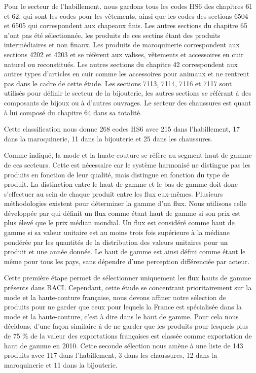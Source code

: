 \documentclass[french,10pt,a4paper]{article}
\begin{document}
Pour le secteur de l'habillement, nous gardons tous les codes HS6 des chapitres 61 et 62, qui sont les codes pour les vêtements, ainsi que les codes des sections 6504 et 6505 qui correspondent aux chapeaux finis. Les autres sections du chapitre 65 n'ont pas été sélectionnée, les produits de ces sectins étant des produits intermédiaires et non finaux. Les produits de maroquinerie correspondent aux sections 4202 et 4203 et se réfèrent aux valises, vêtements et accessoires en cuir naturel ou reconstitués. Les autres sections du chapitre 42 correspondent aux autres types d'articles en cuir comme les accessoires pour animaux et ne rentrent pas dans le cadre de cette étude. Les sections 7113, 7114, 7116 et 7117 sont utilisés pour définir le secteur de la bijouterie, les autres sections se référant à des composants de bijoux ou à d'autres ouvrages. Le secteur des chaussures est quant à lui composé du chapitre 64 dans sa totalité.

Cette classification nous donne 268 codes HS6 avec 215 dans l'habillement, 17 dans la maroquinerie, 11 dans la bijouterie et 25 dans les chaussures. 

Comme indiqué, la mode et la huate-couture se réfère au segment haut de gamme de ces secteurs. Cette est nécessaire car le système harmonisé ne distingue pas les produits en fonction de leur qualité, mais distingue en fonction du type de produit. La distinction entre le haut de gamme et le bas de gamme doit donc s'effectuer au sein de chaque produit entre les flux eux-mêmes. Plusieurs méthodologies existent pour déterminer la gamme d'un flux. Nous utilisons celle développée par \cite{Fontagne1997}  qui définit un flux comme étant haut de gamme si son \og prix\fg{} est plus élevé que le \og prix\fg{} médian mondial. Un flux est considéré comme haut de gamme si sa valeur unitaire est au moins trois fois supérieure à la médiane pondérée par les quantités de la distribution des valeurs unitaires pour un produit et une année donnée. Le haut de gamme est ainsi défini comme étant le même pour tous les pays, sans dépendre d'une perception différenciée par acteur.

Cette première étape permet de sélectionner uniquement les flux hauts de gamme présents dans BACI. Cependant, cette étude se concentrant prioritairement sur la mode et la haute-couture française, nous devons affiner notre sélection de produits pour ne garder que ceux pour lequels la France est spécialisée dans la mode et la haute-couture, c'est à dire dans le haut de gamme. Pour cela nous décidons, d'une façon similaire à \cite{Martin2015} de ne garder que les produits pour lesquels plus de 75 \% de la valeur des exportations françaises est classée comme exportation de haut de gamme en 2010. Cette seconde sélection nous amène à une liste de 143 produits avec 117 dans l'habillement, 3 dans les chaussures, 12 dans la maroquinerie et 11 dans la bijouterie.














\newpage


\end{document}
